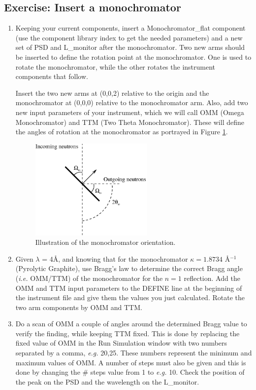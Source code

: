 \subsection{Exercise: Insert a monochromator}
\begin{enumerate}
\item{Keeping your current components, insert a Monochromator\_flat component (use the component library index to get the needed parameters) and a new set of PSD and L\_monitor after the monochromator. Two new arms should be inserted to define the rotation point at the monochromator. One is used to rotate the monochromator, while the other rotates the instrument components that follow. 

Insert the two new arms at (0,0,2) relative to the origin and the monochromator at (0,0,0) relative to the monochromator arm. Also, add two new input parameters of your instrument, which we will call OMM (Omega Monochromator) and TTM (Two Theta Monochromator). These will define the angles of rotation at the monochromator as portrayed in Figure \ref{mono.eps}. 
\begin{figure}[htb!]
\begin{center}
\includegraphics[width=6cm]{pics/mono.eps}
\end{center}
\caption{Illustration of the monochromator orientation.}
\label{mono.eps}
\end{figure}}
\item{Given $\lambda$ = 4\AA, and knowing that for the monochromator $\kappa=1.8734$ \AA$^{-1}$ (Pyrolytic Graphite), use Bragg's law to determine the correct Bragg angle (\emph{i.e.} OMM/TTM) of the monochromator for the $n=1$ reflection. Add the OMM and TTM input parameters to the DEFINE line at the beginning of the instrument file and give them the values you just calculated. Rotate the two arm components by OMM and TTM.}
\item{Do a scan of OMM a couple of angles around the determined Bragg value to verify the finding, while keeping TTM fixed. This is done by replacing the fixed value of OMM in the Run Simulation window with two numbers separated by a comma, \emph{e.g.} 20,25. These numbers represent the minimum and maximum values of OMM. A number of steps must also be given and this is done by changing the \# steps value from 1 to \emph{e.g.} 10. Check the position of the peak on the PSD and the wavelength on the L\_monitor. }

\end{enumerate}
